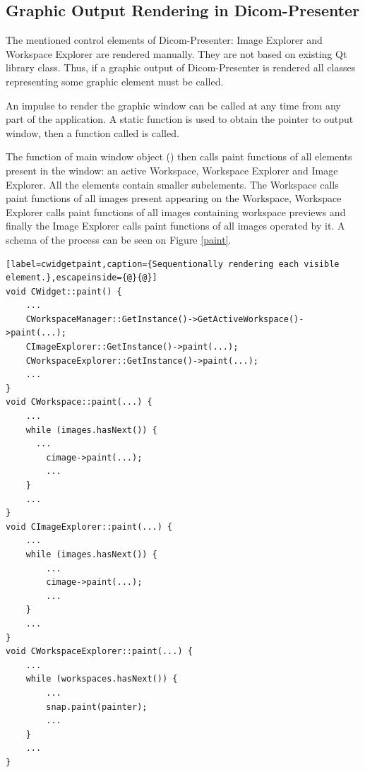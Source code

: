 \subsection{Graphic Output Rendering in Dicom-Presenter}
The mentioned control elements of Dicom-Presenter: Image Explorer and Workspace Explorer are rendered manually. They are not based on existing Qt library class. Thus, if a graphic output of Dicom-Presenter is rendered all classes representing some graphic element must be called. 

An impulse to render the graphic window can be called at any time from any part of the application. A static function is used to obtain the pointer to output window, then a function called  is called.

The  function of main window object () then calls paint functions of all elements present in the window: an active Workspace, Workspace Explorer and Image Explorer. All the elements contain smaller subelements. The Workspace calls paint functions of all images present appearing on the Workspace, Workspace Explorer calls paint functions of all images containing workspace previews and finally the Image Explorer calls paint functions of all images operated by it. A schema of the process can be seen on Figure \ref{paint}.

\begin{lstlisting}[label=cwidgetpaint,caption={Sequentionally rendering each visible element.},escapeinside={@}{@}]
void CWidget::paint() {
	...
	CWorkspaceManager::GetInstance()->GetActiveWorkspace()->paint(...);
	CImageExplorer::GetInstance()->paint(...);
	CWorkspaceExplorer::GetInstance()->paint(...);
	...
}
void CWorkspace::paint(...) {
	...
	while (images.hasNext()) {
	  ...
		cimage->paint(...);
		...
	}
	...
}
void CImageExplorer::paint(...) {
	...
	while (images.hasNext()) {
		...
		cimage->paint(...);
		...
	}
	...
}
void CWorkspaceExplorer::paint(...) {
	...
	while (workspaces.hasNext()) {
		...
		snap.paint(painter);
		...
	}
	...
}
\end{lstlisting}

